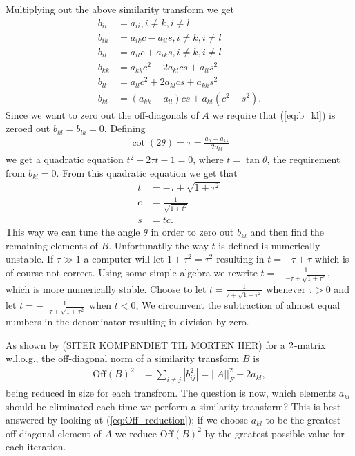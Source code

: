 \documentclass[twocolumn]{aastex62}
\begin{document}
Multiplying out the above similarity transform we get 
\begin{align}
	b_{ii} &= a_{ii} , i\neq k, i\neq l\\
	b_{ik} &= a_{ik}c - a_{il}s, i\neq k, i\neq l\\
	b_{il} &= a_{il}c + a_{ik}s, i\neq k, i\neq l\\
	b_{kk} &= a_{kk}c^2 - 2a_{kl}cs + a_{ll}s^2\\
	b_{ll} &= a_{ll}c^2 + 2a_{kl}cs + a_{kk}s^2\\
	b_{kl} &= (a_{kk} - a_{ll})cs + a_{kl}(c^2 - s^2).
	\label{eq:b_kl}
\end{align}
Since we want to zero out the off-diagonals of $A$ we require that (\ref{eq:b_kl}) is zeroed out $b_{kl} = b_{lk} = 0$. Defining 
\begin{align}
	\cot(2\theta) = \tau = \frac{a_{ll} - a_{kk}}{2a_{kl}}
\end{align}
we get a quadratic equation $t^2 + 2\tau t - 1 = 0$, where $t = \tan \theta$, the requirement from $b_{kl} = 0$. From this quadratic equation we get that 
\begin{align}
	t &= -\tau \pm \sqrt{1+\tau^2}\\
	c & = \frac{1}{\sqrt{1+t^2}}\\
	s &= tc.
\end{align}
This way we can tune the angle $\theta$ in order to zero out $b_{kl}$ and then find the remaining elements of $B$.  Unfortunatlly the way $t$ is defined is numerically unstable. If $\tau\gg1$ a computer will let $1+\tau^2 = \tau^2$ resulting in $t = -\tau \pm \tau$ which is of course not correct. Using some simple algebra we rewrite $t = -\frac{1}{-\tau \pm \sqrt{1 + \tau^2}}$, which is more numerically stable. Choose to let $t = \frac{1}{\tau + \sqrt{1 + \tau^2}}$ whenever $\tau>0$ and let $t = -\frac{1}{-\tau + \sqrt{1+\tau^2}}$ when $t<0$, We circumvent the subtraction of almost equal numbers in the denominator resulting in division by zero.

As shown by (SITER KOMPENDIET TIL MORTEN HER) for a $2\time 2$-matrix w.l.o.g., the off-diagonal norm of a similarity transform $B$ is 
\begin{align}
\text{Off}(B)^2&= \sum_{i\neq j} |b_{ij}^2| = ||A||_F^2 - 2a_{kl},
\label{eq:Off_reduction}
\end{align}
being reduced in size for each transfrom. The question is now, which elements $a_{kl}$ should be eliminated each time we perform a similarity transform? This is best answered by looking at (\ref{eq:Off_reduction}); if we choose $a_{kl}$ to be the greatest off-diagonal element of $A$ we reduce $\text{Off}(B)^2$ by the greatest possible value for each iteration. 
\end{document}
